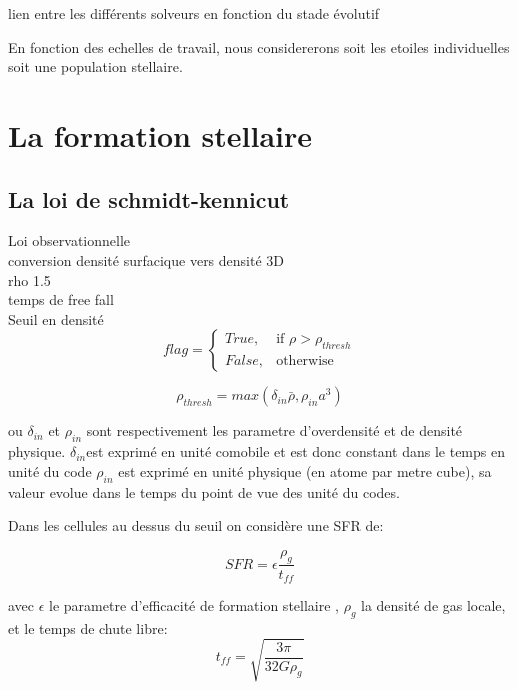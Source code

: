 lien entre les différents solveurs en fonction du stade évolutif

En fonction des echelles de travail, nous considererons soit les etoiles individuelles soit une population stellaire.

\section{La formation stellaire}

\subsection{La loi de schmidt-kennicut}
Loi observationnelle \\
conversion densité surfacique vers densité 3D\\
rho 1.5\\
temps de free fall\\

Seuil en densité \\
\begin{equation}
	flag = 
  \begin{cases}
      True, & \text{if } \rho > \rho_{thresh}\\
      False,              & \text{otherwise}
  \end{cases}
\end{equation} 




\begin{equation}
	\rho_{thresh} = max\left(  \delta_{in} \bar{\rho}, \rho_{in} a^3 \right)
\end{equation} 

ou $\delta_{in}$ et $\rho_{in}$  sont respectivement les parametre d'overdensité et de densité physique.
$\delta_{in}$est exprimé en unité comobile et est donc constant dans le temps en unité du code
 $\rho_{in}$ est exprimé en unité physique (en atome par metre cube), sa valeur evolue dans le temps du point de vue des unité du codes.
 
Dans les cellules au dessus du seuil on considère une SFR de:

\begin{equation}
	SFR = \epsilon \frac{\rho_g}{t_{ff}}
    \label{eq_sfr}
\end{equation}


avec  $\epsilon$ le parametre d'efficacité de formation stellaire , $\rho_g$ la densité de gas locale, et le temps de chute libre:
\begin{equation}
t_{ff} = \sqrt{\frac{3\pi}{32G\rho_g}}
\end{equation}

